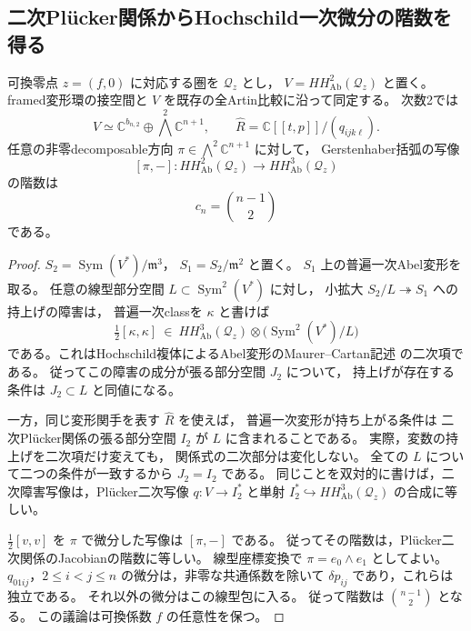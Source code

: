 \subsection{二次Pl\"ucker関係からHochschild一次微分の階数を得る}

\begin{lemma}[形式環の二次関係と一次微分]
\label{lem:quadratic-relations-hochschild-rank}
可換零点 $z=(f,0)$ に対応する圏を $\mathcal Q_z$ とし，
$V=HH^2_{\mathrm{Ab}}(\mathcal Q_z)$ と置く。
framed変形環の接空間と $V$ を既存の全Artin比較に沿って同定する。
次数2では
\[
 V\simeq\mathbb C^{b_{n,2}}\oplus\bigwedge^2\mathbb C^{n+1},
 \qquad
 \widehat R=\mathbb C[[t,p]]/(q_{ijk\ell}).
\]
任意の非零decomposable方向
$\pi\in\bigwedge^2\mathbb C^{n+1}$ に対して，
Gerstenhaber括弧の写像
\[
 [\pi,-]:HH^2_{\mathrm{Ab}}(\mathcal Q_z)
          \longrightarrow HH^3_{\mathrm{Ab}}(\mathcal Q_z)
\]
の階数は
\[
 c_n=\binom{n-1}{2}
\]
である。
\end{lemma}
\begin{proof}
$S_2=\operatorname{Sym}(V^*)/\mathfrak m^3$，
$S_1=S_2/\mathfrak m^2$ と置く。
$S_1$ 上の普遍一次Abel変形を取る。
任意の線型部分空間 $L\subset\operatorname{Sym}^2(V^*)$ に対し，
小拡大 $S_2/L\twoheadrightarrow S_1$ への持上げの障害は，
普遍一次classを $\kappa$ と書けば
\[
 \tfrac12[\kappa,\kappa]\ \in\
 HH^3_{\mathrm{Ab}}(\mathcal Q_z)
       \otimes\bigl(\operatorname{Sym}^2(V^*)/L\bigr)
\]
である。これはHochschild複体によるAbel変形のMaurer--Cartan記述
\cite[Theorem~3.1, Remark~3.5]{LowenVdBHochschild}の二次項である。
従ってこの障害の成分が張る部分空間 $J_2$ について，
持上げが存在する条件は $J_2\subset L$ と同値になる。

一方，同じ変形関手を表す $\widehat R$ を使えば，
普遍一次変形が持ち上がる条件は
二次Pl\"ucker関係の張る部分空間 $I_2$ が $L$ に含まれることである。
実際，変数の持上げを二次項だけ変えても，
関係式の二次部分は変化しない。
全ての $L$ について二つの条件が一致するから $J_2=I_2$ である。
同じことを双対的に書けば，二次障害写像は，Pl\"ucker二次写像
$q:V\to I_2^*$ と単射 $I_2^*\hookrightarrow HH^3_{\mathrm{Ab}}(\mathcal Q_z)$
の合成に等しい。

$\tfrac12[v,v]$ を $\pi$ で微分した写像は $[\pi,-]$ である。
従ってその階数は，Pl\"ucker二次関係のJacobianの階数に等しい。
線型座標変換で $\pi=e_0\wedge e_1$ としてよい。
$q_{01ij}$，$2\le i<j\le n$ の微分は，非零な共通係数を除いて
$\delta p_{ij}$ であり，これらは独立である。
それ以外の微分はこの線型包に入る。
従って階数は $\binom{n-1}{2}$ となる。
この議論は可換係数 $f$ の任意性を保つ。
\end{proof}

